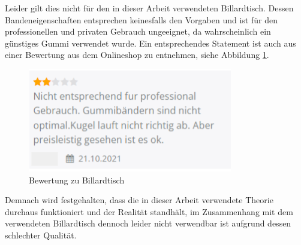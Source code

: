 Leider gilt dies nicht für den in dieser Arbeit verwendeten Billardtisch.
Dessen Bandeneigenschaften entsprechen keinesfalls den Vorgaben und ist für den professionellen und privaten Gebrauch ungeeignet,
da wahrscheinlich ein günstiges Gummi verwendet wurde.
Ein entsprechendes Statement ist auch aus einer Bewertung aus dem Onlineshop zu entnehmen, siehe Abbildung \ref{fig:bewertung_billardtisch}.

\begin{figure}[h!]
    \begin{center}
        \includegraphics[width=0.3\linewidth]{../common/04_results/resources/simulation/00_bewertung_billardtisch.png}
    \end{center}
    \caption{Bewertung zu Billardtisch\cite{gonser:billardtisch}}
    \label{fig:bewertung_billardtisch}
\end{figure}

Demnach wird festgehalten, dass die in dieser Arbeit verwendete Theorie durchaus funktioniert und der Realität
standhält, im Zusammenhang mit dem verwendeten Billardtisch dennoch leider nicht verwendbar ist aufgrund dessen schlechter
Qualität.

